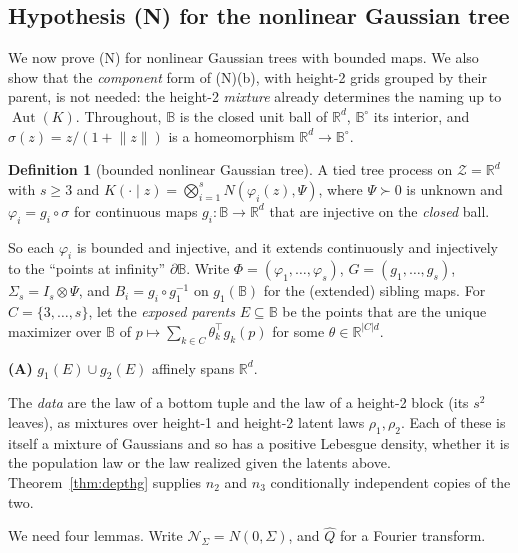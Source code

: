 \documentclass[11pt]{article}
\theoremstyle{definition}
\newtheorem{definition}[theorem]{Definition}
\newcommand{\norm}[1]{\lVert #1\rVert}
\newcommand{\R}{\mathbb R}
\begin{document}
\subsection{Hypothesis (N) for the nonlinear Gaussian tree}\label{sec:ngt}
We now prove (N) for nonlinear Gaussian trees with bounded maps. We also show that the
\emph{component} form of (N)(b), with height-2 grids grouped by their parent, is not needed: the
height-2 \emph{mixture} already determines the naming up to $\operatorname{Aut}(K)$. Throughout,
$\mathbb B$ is the closed unit ball of $\R^d$, $\mathbb B^\circ$ its interior, and
$\sigma(z)=z/(1+\norm z)$ is a homeomorphism $\R^d\to\mathbb B^\circ$.

\begin{definition}[bounded nonlinear Gaussian tree]\label{def:ngt}
A tied tree process on $\mathcal Z=\R^d$ with $s\ge3$ and $K(\cdot\mid z)=\bigotimes_{i=1}^sN(\varphi_i(z),\Psi)$,
where $\Psi\succ0$ is unknown and $\varphi_i=g_i\circ\sigma$ for continuous maps
$g_i:\mathbb B\to\R^d$ that are injective on the \emph{closed} ball.
\end{definition}
\noindent So each $\varphi_i$ is bounded and injective, and it extends continuously and injectively
to the ``points at infinity'' $\partial\mathbb B$. Write $\Phi=(\varphi_1,\dots,\varphi_s)$,
$G=(g_1,\dots,g_s)$, $\Sigma_s=I_s\otimes\Psi$, and $B_i=g_i\circ g_1^{-1}$ on $g_1(\mathbb B)$ for the
(extended) sibling maps. For $C=\{3,\dots,s\}$, let the \emph{exposed parents} $E\subseteq\mathbb B$
be the points that are the unique maximizer over $\mathbb B$ of $p\mapsto\sum_{k\in C}\theta_k^{\!\top}g_k(p)$
for some $\theta\in\R^{|C|d}$.

\medskip\noindent\textbf{(A)} $g_1(E)\cup g_2(E)$ affinely spans $\R^d$.
\medskip

\noindent The \emph{data} are the law of a bottom tuple and the law of a height-2 block (its $s^2$
leaves), as mixtures over height-1 and height-2 latent laws $\rho_1,\rho_2$. Each of these is itself
a mixture of Gaussians and so has a positive Lebesgue density, whether it is the population law or the
law realized given the latents above. Theorem~\ref{thm:depthg} supplies $n_2$ and $n_3$ conditionally
independent copies of the two.

We need four lemmas. Write $\mathcal N_\Sigma=N(0,\Sigma)$, and $\hat Q$ for a Fourier transform.
\end{document}
